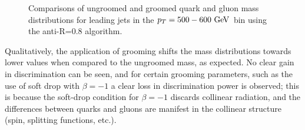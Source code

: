\begin{figure}
\begin{center}
\caption{Comparisons of ungroomed and groomed quark and gluon mass distributions for leading jets in the 
$\pt=500-600 \GeV$ bin using the anti-\kT R=0.8 algorithm. }
\label{fig:qg_pt500_mass_AKt_R08}
\end{center}
\end{figure}
Qualitatively, the application of grooming shifts the mass distributions towards
lower values when compared to the ungroomed mass, as expected. No clear gain in discrimination can be seen, and for
certain grooming parameters, such as the use of soft drop with $\beta=-1$ a clear
loss in discrimination power is observed; this is because the soft-drop condition for $\beta=-1$ discards collinear radiation, and the differences between quarks and gluons are manifest in the collinear structure (spin, splitting functions, etc.). 


